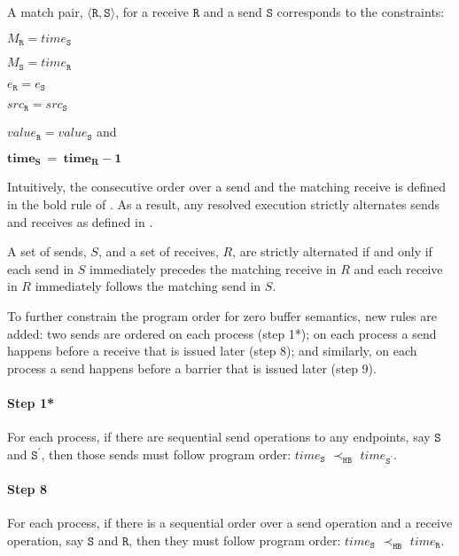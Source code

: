 \begin{definition} \label{def:match*}
A match pair, $\langle\mathtt{R}, \mathtt{S}\rangle$, for a receive
$\mathtt{R}$ and a send $\mathtt{S}$ corresponds to the constraints:
\begin{compactenum}
\item $M_{\mathtt{R}} = \mathit{time}_{\mathtt{S}}$
\item $M_{\mathtt{S}} = \mathit{time}_{\mathtt{R}}$
\item $e_{\mathtt{R}} = e_{\mathtt{S}}$
\item $src_\mathtt{R} = src_\mathtt{S}$
\item $\mathit{value}_{\mathtt{R}} = \mathit{value}_{\mathtt{S}}$ and
\item $\mathit{\textbf{time}}_{\mathtt{\textbf{S}}}\ = \ \mathit{\textbf{time}}_{\mathtt{\textbf{R}}} - \mathit{\textbf{1}}$
\end{compactenum}
\end{definition}

Intuitively, the consecutive order over a send and the matching receive is defined in the bold rule of . As a result, any resolved execution strictly alternates sends and receives as defined in . 

\begin{definition}\label{def:alternate}
A set of sends, $S$, and a set of receives, $R$, are strictly alternated if and only if each send in $S$ immediately precedes the matching receive in $R$ and each receive in $R$ immediately follows the matching send in $S$.
\end{definition}

To further constrain the program order for zero buffer semantics, new rules are added: two sends are ordered on each process (step 1*); on each process a send happens before a receive that is issued later (step 8); and similarly, on each process a send happens before a barrier that is issued later (step 9).

\paragraph*{Step 1*} For each process, if there are sequential send
operations to any endpoints, say $\mathtt{S}$ and $\mathtt{S^\prime}$, then those
sends must follow program order: $\mathit{time}_\mathtt{S}$
$\prec_\mathtt{HB}$ $\mathit{time}_\mathtt{S^\prime}$.

\paragraph*{Step 8} For each process, if there is a sequential order over a send operation and a receive operation, say $\mathtt{S}$ and $\mathtt{R}$, then they must follow program order: 
$\mathit{time}_\mathtt{S}$
$\prec_\mathtt{HB}$ $\mathit{time}_\mathtt{R}$.

